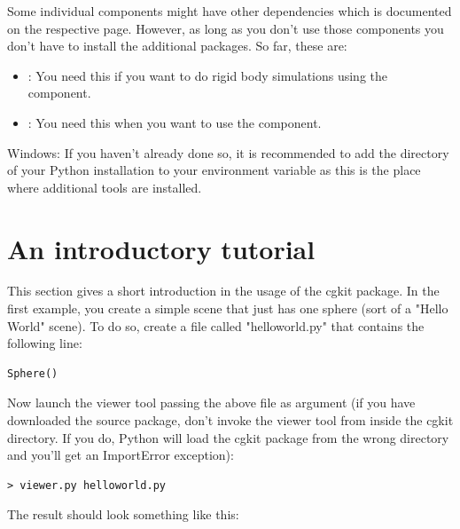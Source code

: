 Some individual components might have other dependencies which is documented
on the respective page. However, as long as you don't use those components
you don't have to install the additional packages. So far, these are:

\begin{itemize}
\item {}: You need this if you want to do rigid body simulations using the  component.
\item {}: You need this when you want to use the  component.
\end{itemize}


Windows: If you haven't already done so, it is recommended to add the
 directory of your Python installation to your
 environment variable as this is the place where additional
tools are installed.

\section{An introductory tutorial}

This section gives a short introduction in the usage of the cgkit package.
In the first example, you create a simple scene that just has one
sphere (sort of a "Hello World" scene). To do so, create a file called
"helloworld.py" that contains the following line:

\begin{verbatim}
Sphere()
\end{verbatim}

Now launch the viewer tool passing the above file as argument (if you
have downloaded the source package, don't invoke the viewer tool from
inside the cgkit directory. If you do, Python will load the cgkit package
from the wrong directory and you'll get an ImportError exception):

\begin{verbatim}
> viewer.py helloworld.py
\end{verbatim}

The result should look something like this:


